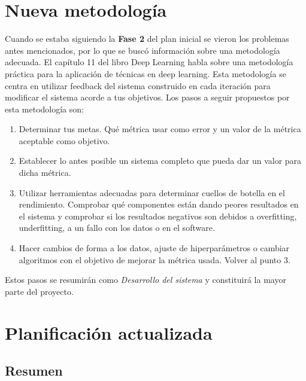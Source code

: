 \section{Nueva metodología}\label{sec:metodologia}

Cuando se estaba siguiendo la \textbf{Fase 2} del plan inicial se vieron los problemas antes mencionados, por lo que se buscó información sobre una metodología adecuada. El capítulo 11 del libro Deep Learning \cite{Goodfellow2016} habla sobre una metodología práctica para la aplicación de técnicas en deep learning. Esta metodología se centra en utilizar feedback del sistema construido en cada iteración para modificar el sistema acorde a tus objetivos. Los pasos a seguir propuestos por esta metodología son:

\begin{enumerate}
\item Determinar tus metas. Qué métrica usar como error y un valor de la métrica aceptable como objetivo.
\item Establecer lo antes posible un sistema completo que pueda dar un valor para dicha métrica.
\item Utilizar herramientas adecuadas para determinar cuellos de botella en el rendimiento. Comprobar qué componentes están dando peores resultados en el sistema y comprobar si los resultados negativos son debidos a overfitting, underfitting, a un fallo con los datos o en el software.
\item Hacer cambios de forma a los datos, ajuste de hiperparámetros o cambiar algoritmos con el objetivo de mejorar la métrica usada. Volver al punto 3.
\end{enumerate}

Estos pasos se resumirán como \textit{Desarrollo del sistema} y constituirá la mayor parte del proyecto.
\newpage
\section{Planificación actualizada}\label{sec:planactualizado}

\subsection{Resumen}\label{subsec:resumenplanactualizado}



